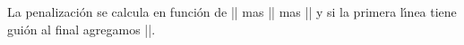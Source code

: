 


\bigskip


\bigskip

\respuestaS La penalizaci\'on se calcula en funci\'on de
|\interlinepenalty| mas |\clubpenalty| mas |\widowpenalty| y si la
primera l\'{\i}nea tiene gui\'on al final agregamos |\brokenpenalty|.

\bye

